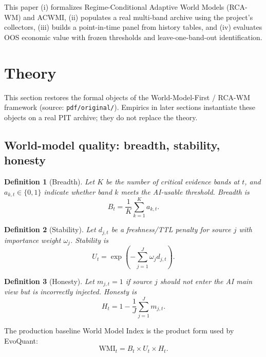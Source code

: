 \documentclass[12pt]{article}
\newtheorem{definition}{Definition}
\begin{document}
This paper (i) formalizes Regime-Conditional Adaptive World Models (RCA-WM) and ACWMI, (ii) populates a real multi-band archive using the project's collectors, (iii) builds a point-in-time panel from history tables, and (iv) evaluates OOS economic value with frozen thresholds and leave-one-band-out identification.

\section{Theory}
\label{sec:theory}

This section restores the formal objects of the World-Model-First / RCA-WM framework
(source: \texttt{pdf/original/}). Empirics in later sections instantiate these objects on a real PIT archive; they do not replace the theory.

\subsection{World-model quality: breadth, stability, honesty}
\label{sec:wmi}

\begin{definition}[Breadth]
Let $K$ be the number of critical evidence bands at $t$, and $a_{k,t}\in\{0,1\}$ indicate whether band $k$ meets the AI-usable threshold. Breadth is
\begin{equation}
B_t=\frac{1}{K}\sum_{k=1}^{K}a_{k,t}.
\label{eq:breadth}
\end{equation}
\end{definition}

\begin{definition}[Stability]
Let $d_{j,t}$ be a freshness/TTL penalty for source $j$ with importance weight $\omega_j$. Stability is
\begin{equation}
U_t=\exp\!\left(-\sum_{j=1}^{J}\omega_j d_{j,t}\right).
\label{eq:stability}
\end{equation}
\end{definition}

\begin{definition}[Honesty]
Let $m_{j,t}=1$ if source $j$ should not enter the AI main view but is incorrectly injected. Honesty is
\begin{equation}
H_t=1-\frac{1}{J}\sum_{j=1}^{J}m_{j,t}.
\label{eq:honesty}
\end{equation}
\end{definition}

The production baseline World Model Index is the product form used by EvoQuant:
\begin{equation}
\mathrm{WMI}_t=B_t\times U_t\times H_t.
\label{eq:wmi}
\end{equation}
\end{document}
